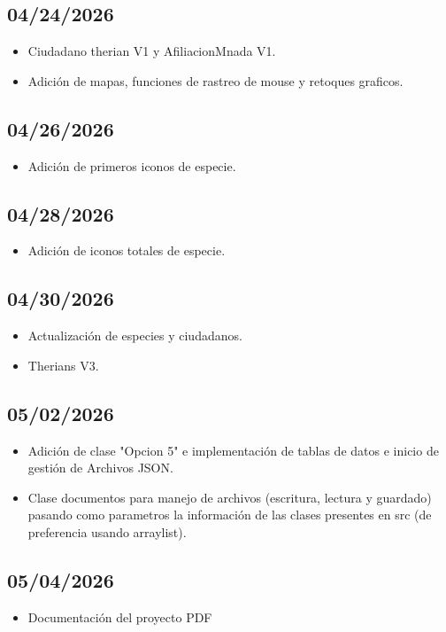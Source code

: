 \documentclass[man]{apa7}
\begin{document}
	\subsection{04/24/2026}
		\begin{itemize}
			\item Ciudadano therian V1 y AfiliacionMnada V1.
			\item Adición de mapas, funciones de rastreo de mouse y retoques graficos.
		\end{itemize}
	\subsection{04/26/2026}
		\begin{itemize}
			\item Adición de primeros iconos de especie.
		\end{itemize}
	\subsection{04/28/2026}
		\begin{itemize}
			\item Adición de iconos totales de especie.
		\end{itemize}
	\subsection{04/30/2026}
		\begin{itemize}
			\item Actualización de especies y ciudadanos.
			\item Therians V3.
		\end{itemize}
	\subsection{05/02/2026}
		\begin{itemize}
			\item Adición de clase "Opcion 5" e implementación de tablas de datos e inicio de gestión de Archivos JSON.
			\item Clase documentos para manejo de archivos (escritura, lectura y guardado) pasando como parametros la información de las clases presentes en src (de preferencia usando arraylist).
		\end{itemize}
	\subsection{05/04/2026}
		\begin{itemize}
			\item Documentación del proyecto PDF
		\end{itemize}
\end{document}

